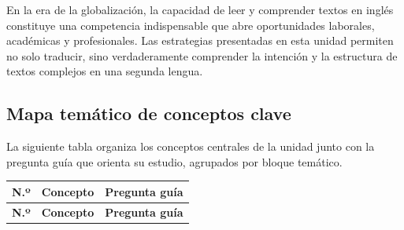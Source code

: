 \documentclass[12pt,oneside]{book}
\begin{document}
En la era de la globalización, la capacidad de leer y comprender textos en inglés constituye una competencia indispensable que abre oportunidades laborales, académicas y profesionales. Las estrategias presentadas en esta unidad permiten no solo traducir, sino verdaderamente comprender la intención y la estructura de textos complejos en una segunda lengua.

\subsection{Mapa temático de conceptos clave}

La siguiente tabla organiza los conceptos centrales de la unidad junto con la pregunta guía que orienta su estudio, agrupados por bloque temático.

\begin{longtable}{@{}
    >{\raggedright\arraybackslash}p{}
    >{\raggedright\arraybackslash}p{}
    >{\raggedright\arraybackslash}p{}@{}
}
\toprule
\textbf{N.º} & \textbf{Concepto} & \textbf{Pregunta guía} \\
\midrule
\endfirsthead
\toprule
\textbf{N.º} & \textbf{Concepto} & \textbf{Pregunta guía} \\
\midrule
\endhead


\end{longtable}
\end{document}
